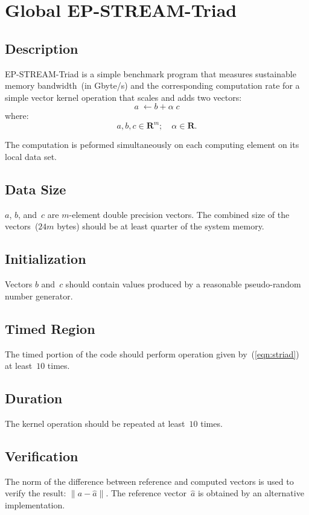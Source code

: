 \documentclass[twocolumn]{article}
\newcommand{\STREAM}{\textsf{STREAM}\xspace}
\begin{document}
\section{Global EP-\STREAM{}-Triad}
\subsection{Description}
EP-\STREAM{}-Triad is a simple benchmark program that measures sustainable
memory bandwidth~(in Gbyte/s) and the corresponding computation rate for
a simple vector kernel operation that scales and adds two vectors:
\begin{equation}
a\;\leftarrow b+\alpha\;c
\label{eqn:striad}
\end{equation}
where:
\[a, b, c\in\mathbf{R}^m; \quad \alpha\in\mathbf{R}.\]

The computation is peformed simultaneously on each computing element on its
local data set.

\subsection{Data Size}
$a$, $b$, and~$c$ are $m$-element double precision vectors. The combined size
of the vectors~($24m$ bytes) should be at least quarter of the system memory.

\subsection{Initialization}
Vectors $b$ and~$c$ should contain values produced by a reasonable
pseudo-random number generator.

\subsection{Timed Region}
The timed portion of the code should perform operation given
by~(\ref{eqn:striad}) at least~$10$ times.

\subsection{Duration}
The kernel operation should be repeated at least~$10$ times.

\subsection{Verification}
The norm of the difference between reference and computed vectors is used to
verify the result: $\|a-\hat{a}\|$. The reference vector~$\hat{a}$ is obtained
by an alternative implementation.
\end{document}
